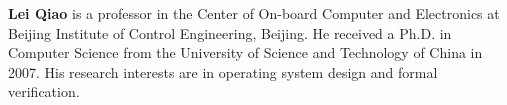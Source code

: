 \documentclass[twoside]{article}
\begin{document}
\begin{multicols}{2}
\noindent\parbox{8.3cm}
{
{\small\quad 
  {\bf Lei Qiao}  
  is a professor in the Center of On-board Computer 
  and Electronics at Beijing Institute of Control Engineering, Beijing. 
  He received a Ph.D. in Computer Science from 
  the University of Science and Technology of China in 2007. 
  His research interests are in operating system design 
  and formal verification.
}\\[1mm]}

\label{last-page}
\end{multicols}
\label{last-page}
\end{document}
